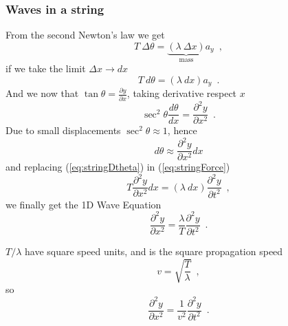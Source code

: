 \documentclass{beamer}
\begin{document}
\begin{frame}
	\frametitle{Waves in a string}		
From the second Newton's law we get
\[T\ \Delta \theta = \underbrace{(\lambda\ \Delta x)}_\text{mass} a_y \enspace ,\]
if we take the limit $\Delta x \rightarrow dx$
\begin{equation}
T\ d\theta = (\lambda\ dx) a_y \enspace .
\label{eq:stringForce}
\end{equation}
And we now that $\tan \theta = \frac{\partial y}{\partial x}$, taking derivative respect $x$
\[\sec^2 \theta \frac{d\theta}{dx} = \frac{\partial^2 y}{\partial x^2} \enspace .\]
Due to small displacements $\sec^2 \theta \approx 1$, hence
\begin{equation}
d\theta \approx \frac{\partial^2 y}{\partial x^2} dx
\label{eq:stringDtheta}
\end{equation}
and replacing (\ref{eq:stringDtheta}) in  (\ref{eq:stringForce})
\[T \frac{\partial^2 y}{\partial x^2} dx = (\lambda\ dx) \frac{\partial^2 y}{\partial t^2} \enspace ,\]
we finally get the 1D Wave Equation
\[\frac{\partial^2 y}{\partial x^2} = \frac{\lambda}{T} \frac{\partial^2 y}{\partial t^2} \enspace .\]

$T/\lambda$ have square speed units, and is the square propagation speed
\[v = \sqrt{\frac{T}{\lambda}} \enspace ,\]
so
\[\frac{\partial^2 y}{\partial x^2} = \frac{1}{v^2} \frac{\partial^2 y}{\partial t^2} \enspace .\]

\end{frame}

\end{document}
